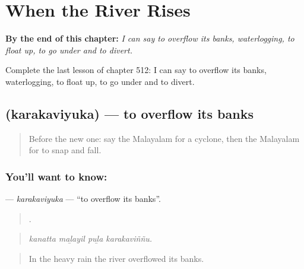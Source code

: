 
\chapter{When the River Rises}
\label{ch:ml-when-the-river-rises}

\begin{chapteropening}
\textbf{By the end of this chapter:} \emph{I can say to overflow its banks, waterlogging, to float up, to go under and to divert.}

Complete the last lesson of chapter 512: I can say to overflow its banks, waterlogging, to float up, to go under and to divert.
\end{chapteropening}

\section[\texorpdfstring{\ml{കരകവിയുക} (karakaviyuka)}{കരകവിയുക (karakaviyuka)}]{ (karakaviyuka) — to overflow its banks}

\label{lesson:ML-C512-karakaviyuka}



\begin{quote}
Before the new one: say the Malayalam for a cyclone, then the Malayalam for to snap and fall.
\end{quote}

\subsection*{You'll want to know: }
\textbf{} — \emph{karakaviyuka} — \textquotedblleft{}to overflow its banks\textquotedblright{}.

\begin{quote}
   .
\end{quote}

\begin{quote}
\emph{kanatta maḻayil puḻa karakaviññu.}
\end{quote}

\begin{quote}
In the heavy rain the river overflowed its banks.
\end{quote}

